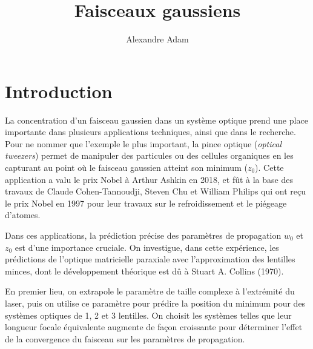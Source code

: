 \documentclass[10pt,letterpaper,twocolumn]{article}
\title{\vspace{-10mm}\Large
Faisceaux gaussiens %
\vspace{-4mm}}
\author{\large
Alexandre Adam
}
\date{\vspace{-8mm}}
\newcommand{\s}{\hspace{0.1cm}}
\begin{document}
\twocolumn[
\maketitle
\begin{onecolabstract} %
Les paramètres de propagations $z_0$, $w_0$, $\mathcal{I}m\left\{q_0\right\}$ et $\theta_0$ sont estimés expérimentalement et comparés avec les paramètres de propagation prédits par l'optique matricielle dans l'approximation des lentilles minces. On trouve que l'accord varie entre $4\%$ et $15\%$, pour un paramètre à la fois, exhibant les effets d'optimisation du <<no free lunch theorem>>. On observe la demie-largeur $w_0 = (101 \pm 2) \s \mu\text{m}$ pour une lentille avec $f = 17.5\s \text{mm}$, une taille caractéristique $4\%$ plut petite que la largeur attendue $w_0 = (105.6 \pm 0.1) \s \mu\text{m}$. On observe aussi qu'un système moins convergent atteint systématiquement une demie-largeur plus grande que la valeur prédite ($8\%$ et $15\%$), alors que la précision sur $z_0$ s'améliore pour des systèmes moins convergents ($8\%$ puis $4\%$). 
\vspace{4mm} %
\end{onecolabstract}
]

\section{Introduction}\label{intro} %
La concentration d'un faisceau gaussien dans un système optique prend une place importante dans plusieurs applications techniques, ainsi que dans le recherche. Pour ne nommer que l'exemple le plus important, la pince optique (\textit{optical tweezers}) permet de manipuler des particules ou des cellules organiques en les capturant au point où le faisceau gaussien atteint son minimum ($z_0$). Cette application a valu le prix Nobel à Arthur Ashkin en 2018, et fût à la base des travaux de Claude Cohen-Tannoudji, Steven Chu et William Philips qui ont reçu le prix Nobel en 1997 pour leur travaux sur le refroidissement et le piégeage d'atomes. \par
Dans ces applications, la prédiction précise des paramètres de propagation $w_0$ et $z_0$ est d'une importance cruciale. On investigue, dans cette expérience, les prédictions de l'optique matricielle paraxiale avec l'approximation des lentilles minces, dont le développement théorique est dû à Stuart A. Collins\supercite{Collins1970} (1970).\par
En premier lieu, on extrapole le paramètre de taille complexe à l'extrémité du laser, puis on utilise ce paramètre pour prédire la position du minimum pour des systèmes optiques de 1, 2 et 3 lentilles. On choisit les systèmes telles que leur longueur focale équivalente augmente de façon croissante pour déterminer l'effet de la convergence du faisceau sur les paramètres de propagation.
\end{document}
